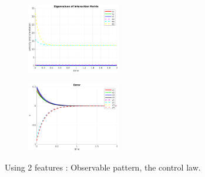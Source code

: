 \documentclass[a4paper,12pt]{article}
\begin{document}
\begin{figure}[tb!]
\begin{subfigure}[b]{0.2\textwidth}
                \centering
                \includegraphics[height=1.2in]{../results/Demo3-eignen.png}
                 \end{subfigure}%
         \begin{subfigure}[b]{0.32\textwidth}
                \centering
                \includegraphics[height=1.2in]{../results/Demo3-error.png}
                 \end{subfigure}%
         \caption{Using 2 features : Observable pattern, the control law.}
        \label{fig:demo3}
\end{figure}
\end{document}
